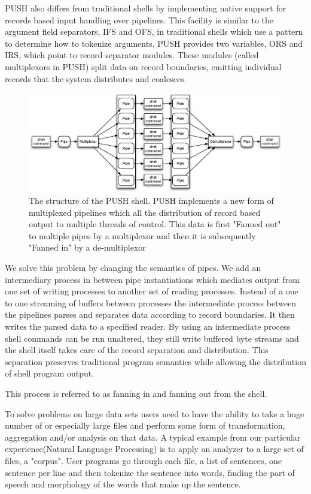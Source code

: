 \documentclass[11pt, letterpaper]{article}
\begin{document}
PUSH also differs from traditional shells by implementing native support for 
records based input handling over pipelines. This facility is similar to the 
argument field separators, IFS and OFS, in traditional shells which use a 
pattern to determine how to tokenize arguments. PUSH provides two variables, 
ORS and IRS, which point to record separator modules. These modules 
(called multiplexors in PUSH) split data on record boundaries, emitting 
individual records that the system distributes and coalesces. 



\begin{figure}[htp]
\centering
\includegraphics[width=4.5in]{pipestruct.eps}
\caption{The structure of the PUSH shell. PUSH implements a new form of multiplexed pipelines which all the distribution of record based output to multiple threads of control. This data is first "Fanned out" to multiple pipes by a multiplexor and then it is subsequently "Fanned in" by a de-multiplexor}\label{fig:pipestruct} 
\end{figure}
We solve this problem by changing the semantics of pipes.  We add an intermediary process in between pipe instantiations which mediates output from one set of writing processes to another set of reading processes. Instead of a one to one streaming of buffers between processes the intermediate process between the pipelines parses and separates data according to record boundaries. It then writes the parsed data to a specified reader. By using an intermediate process shell commands can be run unaltered, they still write buffered byte streams and the shell itself takes care of the record separation and distribution. This separation preserves traditional program semantics while allowing the distribution of shell program output.

This process is referred to as fanning in and fanning out from the shell.    

To solve problems on large data sets users need to have the ability to take a huge number of or especially large files and  perform some form of transformation, aggregation and/or analysis on that data.  A typical example from our particular experience(Natural Language Processing) is to apply an analyzer to a large set of files, a "corpus". User programs go through each file, a list of sentences, one sentence per line and then tokenize the sentence into words, finding the part of speech and morphology of the words that make up the sentence.
\end{document}
